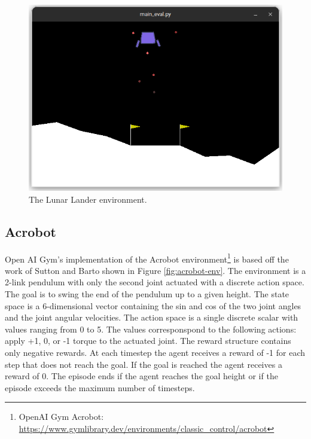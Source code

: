 \begin{figure}[htbp]
    \centerline{\includegraphics[width=\columnwidth]{./img/lunar-lander-env.png}}
    \caption{The Lunar Lander environment.}
    \label{fig:lunar-lander-env}
\end{figure}


\subsection{Acrobot}

Open AI Gym's implementation of the Acrobot 
environment\footnote{OpenAI Gym Acrobot: \url{https://www.gymlibrary.dev/environments/classic_control/acrobot}}
is based off the work of Sutton and Barto\cite{sutton2018reinforcement} shown in Figure \ref{fig:acrobot-env}.
The environment is a 2-link pendulum with only the second joint actuated with a discrete action space. The goal is to swing the end of the pendulum up to a given height. 
The state space is a 6-dimensional vector containing the sin and cos of the two joint angles and the joint angular velocities.
The action space is a single discrete scalar with values ranging from 0 to 5. The values corresponspond to the following actions:
apply +1, 0, or -1 torque to the actuated joint. 
The reward structure contains only negative rewards. At each timestep the agent receives a reward of -1 for each step that does not reach the goal.
If the goal is reached the agent receives a reward of 0. The episode ends if the agent reaches the goal height or if the episode exceeds the maximum number of timesteps.

